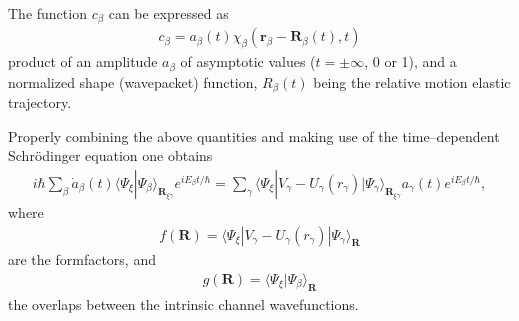 The function $c_\beta$ can be expressed as
\begin{align}
c_\beta=a_\beta(t)\chi_\beta(\mathbf r_\beta-\mathbf R_\beta(t),t)
\end{align}
product of an amplitude $a_\beta$ of asymptotic values ($t=\pm\infty$, 0 or 1), and a normalized shape (wavepacket) function, $R_\beta(t)$ being the relative motion elastic trajectory.


Properly combining the above quantities and making use of the time--dependent Schr\"odinger equation one obtains 
\begin{align}
i\hbar\sum_{\beta}\dot a_\beta(t)\langle\Psi_\xi|\Psi_\beta\rangle_{\mathbf R_{\xi\gamma}}e^{iE_\beta t/\hbar}=\sum_{\gamma}\langle\Psi_\xi|V_\gamma-U_\gamma(r_\gamma)|\Psi_\gamma\rangle_{\mathbf R_{\xi\gamma}}a_\gamma(t)e^{iE_\beta t/\hbar},
\end{align}
where
\begin{align}
f(\mathbf R)=\langle\Psi_\xi|V_\gamma-U_\gamma(r_\gamma)|\Psi_\gamma\rangle_{\mathbf R}
\end{align}
are the formfactors, and
\begin{align}
g(\mathbf R)=\langle\Psi_\xi|\Psi_\beta\rangle_{\mathbf R}
\end{align}
the overlaps between the intrinsic channel wavefunctions.



